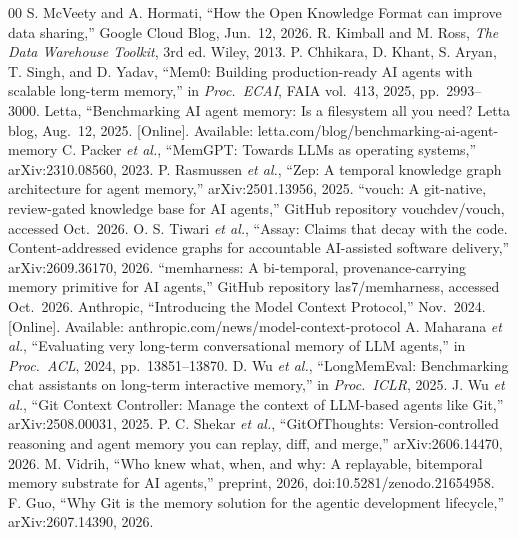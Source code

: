 \documentclass[conference,letterpaper]{IEEEtran}
\begin{document}
\begin{thebibliography}{00}\footnotesize
{} S. McVeety and A. Hormati, ``How the Open Knowledge Format can improve data sharing,'' Google Cloud Blog, Jun.\ 12, 2026.
 R. Kimball and M. Ross, \emph{The Data Warehouse Toolkit}, 3rd ed. Wiley, 2013.
 P. Chhikara, D. Khant, S. Aryan, T. Singh, and D. Yadav, ``Mem0: Building production-ready AI agents with scalable long-term memory,'' in \emph{Proc.\ ECAI}, FAIA vol.~413, 2025, pp.~2993--3000.
 Letta, ``Benchmarking AI agent memory: Is a filesystem all you need? Letta blog, Aug.\ 12, 2025. [Online]. Available: letta.com/blog/benchmarking-ai-agent-memory
 C. Packer \emph{et al.}, ``MemGPT: Towards LLMs as operating systems,'' arXiv:2310.08560, 2023.
 P. Rasmussen \emph{et al.}, ``Zep: A temporal knowledge graph architecture for agent memory,'' arXiv:2501.13956, 2025.
 ``vouch: A git-native, review-gated knowledge base for AI agents,'' GitHub repository vouchdev/vouch, accessed Oct.\ 2026.
 O. S. Tiwari \emph{et al.}, ``Assay: Claims that decay with the code. Content-addressed evidence graphs for accountable AI-assisted software delivery,'' arXiv:2609.36170, 2026.
 ``memharness: A bi-temporal, provenance-carrying memory primitive for AI agents,'' GitHub repository las7/memharness, accessed Oct.\ 2026.
 Anthropic, ``Introducing the Model Context Protocol,'' Nov.\ 2024. [Online]. Available: anthropic.com/news/model-context-protocol
 A. Maharana \emph{et al.}, ``Evaluating very long-term conversational memory of LLM agents,'' in \emph{Proc.\ ACL}, 2024, pp.~13851--13870.
 D. Wu \emph{et al.}, ``LongMemEval: Benchmarking chat assistants on long-term interactive memory,'' in \emph{Proc.\ ICLR}, 2025.
 J. Wu \emph{et al.}, ``Git Context Controller: Manage the context of LLM-based agents like Git,'' arXiv:2508.00031, 2025.
 P. C. Shekar \emph{et al.}, ``GitOfThoughts: Version-controlled reasoning and agent memory you can replay, diff, and merge,'' arXiv:2606.14470, 2026.
 M. Vidrih, ``Who knew what, when, and why: A replayable, bitemporal memory substrate for AI agents,'' preprint, 2026, doi:10.5281/zenodo.21654958.
 F. Guo, ``Why Git is the memory solution for the agentic development lifecycle,'' arXiv:2607.14390, 2026.
\end{thebibliography}
\end{document}
